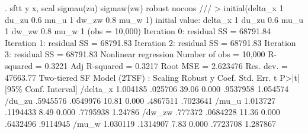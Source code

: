 . sftt y x, scal sigmau(zu) sigmaw(zw) robust nocons ///
>          initial(delta_x 1 du_zu 0.6 mu_u 1 dw_zw 0.8 mu_w 1)
initial value: delta_x 1 du_zu 0.6 mu_u 1 dw_zw 0.8 mu_w 1
(obs = 10,000)
{\smallskip}
Iteration 0:  residual SS =  68791.84
Iteration 1:  residual SS =  68791.83
Iteration 2:  residual SS =  68791.83
Iteration 3:  residual SS =  68791.83
{\smallskip}
{\smallskip}
Nonlinear regression                                Number of obs =     10,000
                                                    R-squared     =     0.3221
                                                    Adj R-squared =     0.3217
                                                    Root MSE      =   2.623476
                                                    Res. dev.     =   47663.77
{\smallskip}
Two-tiered SF Model (2TSF) : Scaling
             {\VBAR}               Robust
           y {\VBAR}      Coef.   Std. Err.      t    P>|t|     [95\% Conf. Interval]
    /delta_x {\VBAR}   1.004185    .025706    39.06   0.000     .9537958    1.054574
      /du_zu {\VBAR}   .5945576   .0549976    10.81   0.000     .4867511    .7023641
       /mu_u {\VBAR}   1.013727   .1194433     8.49   0.000     .7795938     1.24786
      /dw_zw {\VBAR}    .777372   .0684228    11.36   0.000     .6432496    .9114945
       /mu_w {\VBAR}   1.030119   .1314907     7.83   0.000     .7723708    1.287867
